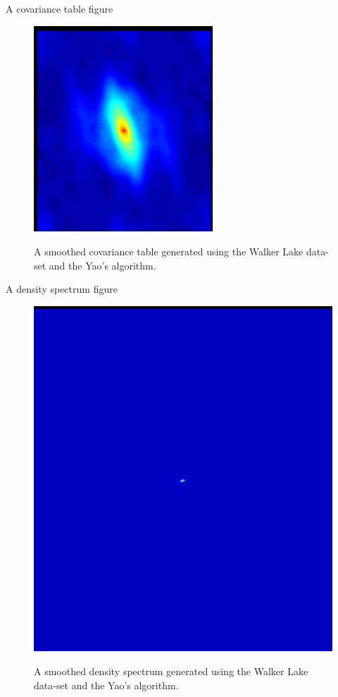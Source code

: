 \begin{frame}{A covariance table figure}

\begin{figure}[!ht]
  \caption{A smoothed covariance table generated using the Walker Lake data-set and the Yao's algorithm.}
  \centering
    \includegraphics[height=0.4\textheight, width=0.6\textwidth]{figs/cov_table_fig.png}
    \label{cov_table_ex.fig}
\end{figure}

\end{frame}

\begin{frame}{A density spectrum figure}
\begin{figure}[!ht]
  \caption{A smoothed density spectrum generated using the Walker Lake data-set and the Yao's algorithm.}
  \centering
    \includegraphics[height=0.5\textheight]{figs/dens_spec.png}
    \label{dens_spec.fig}
\end{figure}
\end{frame}


